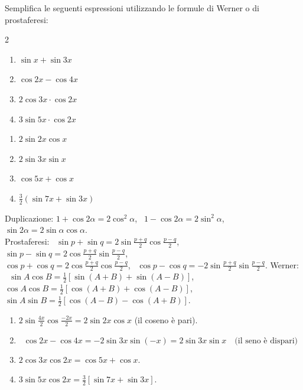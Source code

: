
\begin{question}[ID=3.2, subtitle={Formule di Werner e prostaferesi — serie 2}, tags={goniometria, prostaferesi, Werner}, difficulty=media]
Semplifica le seguenti espressioni utilizzando le formule di Werner o di prostaferesi:
\begin{multicols}{2}
\begin{enumerate}
\item $\sin x + \sin 3x$
\item $\cos 2x - \cos 4x$
\item $2 \cos 3x \cdot \cos 2x$
\item $3 \sin 5x \cdot \cos 2x$
\end{enumerate}
\end{multicols}
\begin{solution}
\begin{enumerate}
    \item $2\sin2x\cos x$
    \item $2\sin3x\sin x$
    \item $\cos5x+\cos x$
    \item $\tfrac32(\sin7x+\sin3x)$
\end{enumerate}
\end{solution}
\begin{explanation}
Duplicazione: $1+\cos2\alpha=2\cos^2\alpha$, \ $1-\cos2\alpha=2\sin^2\alpha$, \ $\sin2\alpha=2\sin\alpha\cos\alpha$. \\
Prostaferesi: \ $\sin p+\sin q=2\sin\tfrac{p+q}{2}\cos\tfrac{p-q}{2}$, \ $\sin p-\sin q=2\cos\tfrac{p+q}{2}\sin\tfrac{p-q}{2}$, \\
$\cos p+\cos q=2\cos\tfrac{p+q}{2}\cos\tfrac{p-q}{2}$, \ $\cos p-\cos q=-2\sin\tfrac{p+q}{2}\sin\tfrac{p-q}{2}$.
Werner: \ $\sin A\cos B=\tfrac12[\sin(A+B)+\sin(A-B)]$, \ $\cos A\cos B=\tfrac12[\cos(A+B)+\cos(A-B)]$, \ $\sin A\sin B=\tfrac12[\cos(A-B)-\cos(A+B)]$.
\begin{enumerate}
    \item $2\sin\tfrac{4x}{2}\cos\tfrac{-2x}{2}=2\sin2x\cos x$ (il coseno è pari).
    \item \[ \cos2x-\cos4x=-2\sin3x\sin(-x)=2\sin3x\sin x \quad \text{(il seno è dispari)} \]
    \item $2\cos3x\cos2x=\cos5x+\cos x$.
    \item $3\sin5x\cos2x=\tfrac32\left[\sin7x+\sin3x\right]$.
\end{enumerate}
\end{explanation}
\end{question}

